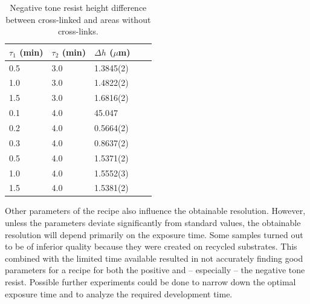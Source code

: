 \begin{table}[H]
    \centering
    \caption{Negative tone resist height difference between cross-linked and areas without cross-links.}
    \begin{tabular}{X l l l l}
	$\tau_1$ (min) & $\tau_2$ (min) & $\Delta h$ ($\mu$m) \\
        \hline\hline
        0.5 & 3.0 & 1.3845(2)  \\
        1.0 & 3.0 & 1.4822(2)  \\
        1.5 & 3.0 & 1.6816(2)  \\
        0.1 & 4.0 & 45.047     \\
        0.2 & 4.0 & 0.5664(2)  \\
        0.3 & 4.0 & 0.8637(2)  \\
        0.5 & 4.0 & 1.5371(2)  \\
        1.0 & 4.0 & 1.5552(3)  \\
        1.5 & 4.0 & 1.5381(2)  \\
        \hline
    \end{tabular}
    \label{tab:neg_profile}
\end{table} Other parameters of the recipe also influence the obtainable resolution. However, unless the parameters deviate significantly from standard values, the obtainable resolution will depend primarily on the exposure time. Some samples turned out to be of inferior quality because they were created on recycled substrates. This combined with the limited time available resulted in not accurately finding good parameters for a recipe for both the positive and -- especially -- the negative tone resist. Possible further experiments could be done to narrow down the optimal exposure time and to analyze the required development time.